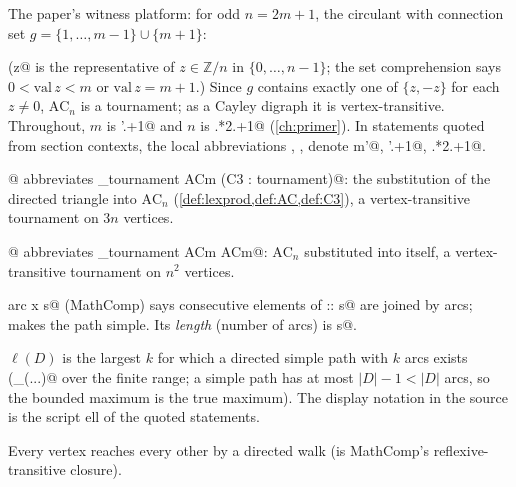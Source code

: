 
The paper's witness platform: for odd $n = 2m+1$, the circulant with
connection set $g = \{1, \dots, m-1\} \cup \{m+1\}$:



\noindent
(\rocqinline@val z@ is the representative of $z \in \mathbb{Z}/n$ in
$\{0,\dots,n{-}1\}$; the set comprehension says $0 < \mathrm{val}\, z
< m$ or $\mathrm{val}\, z = m+1$.) Since $g$ contains exactly one of
$\{z, -z\}$ for each $z \ne 0$, $\mathrm{AC}_n$ is a tournament; as a
Cayley digraph it is vertex-transitive. Throughout, $m$ is
\rocqinline@m'.+1@ and $n$ is \rocqinline@m.*2.+1@
(\cref{ch:primer}). In statements quoted from section contexts, the
local abbreviations \rocqinline@ACm@, \rocqinline@m@, \rocqinline@n@
denote \rocqinline@AC m'@, \rocqinline@m'.+1@, \rocqinline@m.*2.+1@.


@ abbreviates
\rocqinline@lexprod_tournament ACm (C3 : tournament)@: the
substitution of the directed triangle into $\mathrm{AC}_n$
(\cref{def:lexprod,def:AC,def:C3}), a vertex-transitive tournament on
$3n$ vertices.


@ abbreviates \rocqinline@lexprod_tournament ACm ACm@:
$\mathrm{AC}_n$ substituted into itself, a vertex-transitive
tournament on $n^2$ vertices.




\noindent \rocqinline@path arc x s@ (MathComp) says consecutive
elements of \rocqinline@x :: s@ are joined by arcs;
\rocqinline@uniq@ makes the path simple. Its \emph{length} (number of
arcs) is \rocqinline@size s@.




\noindent $\ell(D)$ is the largest $k$ for which a directed simple
path with $k$ arcs exists (\rocqinline@\max_(...)@ over the finite
range; a simple path has at most $|D| - 1 < |D|$ arcs, so the bounded
maximum is the true maximum). The display notation in the source is the script ell of
the quoted statements.




\noindent Every vertex reaches every other by a directed walk
(\rocqinline@connect@ is MathComp's reflexive-transitive closure).
